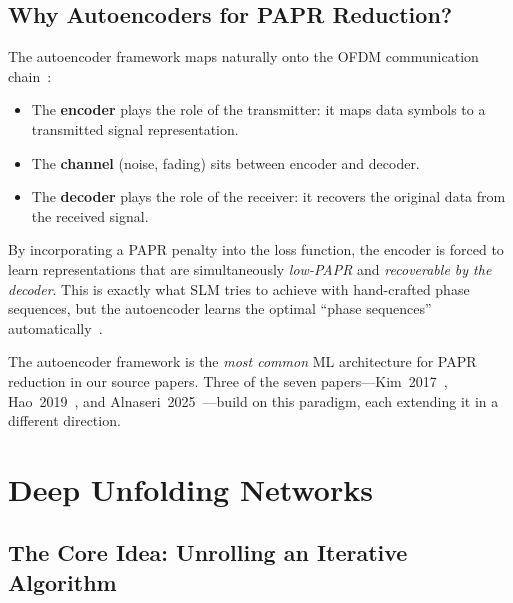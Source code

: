 \subsection{Why Autoencoders for PAPR Reduction?}

The autoencoder framework maps naturally onto the OFDM communication
chain~\cite{kim2017novel,alnaseri2025deep}:

\begin{itemize}
    \item The \textbf{encoder} plays the role of the transmitter:
          it maps data symbols to a transmitted signal representation.
    \item The \textbf{channel} (noise, fading) sits between encoder
          and decoder.
    \item The \textbf{decoder} plays the role of the receiver:
          it recovers the original data from the received signal.
\end{itemize}

By incorporating a PAPR penalty into the loss function, the encoder
is forced to learn representations that are simultaneously
\emph{low-PAPR} and \emph{recoverable by the decoder}.
This is exactly what SLM tries to achieve with hand-crafted phase
sequences, but the autoencoder learns the optimal ``phase sequences''
automatically~\cite{kim2017novel,hao2019extended}.

\begin{keyinsight}
    The autoencoder framework is the \emph{most common} ML architecture for
    PAPR reduction in our source papers.
    Three of the seven papers---Kim~2017~\cite{kim2017novel},
    Hao~2019~\cite{hao2019extended}, and
    Alnaseri~2025~\cite{alnaseri2025deep}---build on this paradigm,
    each extending it in a different direction.
\end{keyinsight}


\section{Deep Unfolding Networks}
\label{sec:deep_unfolding}

\subsection{The Core Idea: Unrolling an Iterative Algorithm}

